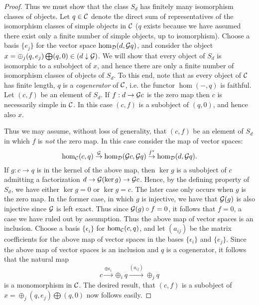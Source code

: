 \documentclass[a4paper]{amsart}
\begin{document}
\begin{proof}
Thus we must show that the class $S_d$ has finitely many isomorphism classes of objects. Let $q \in \mathcal C$ denote the direct sum of representatives of the isomorphism classes of simple objects in $\mathcal C$ ($q$ exists because we have assumed there exist only a finite number of simple objects, up to isomorphism). Choose a basis $\{e_j\}$ for the vector space $\hom_{\mathcal D}(d, \mathcal G q)$, and consider the object $x = \oplus_j( q, e_j) \bigoplus (q,0) \in (d \downarrow \mathcal G)$. We will show that every object of $S_d$ is isomorphic to a subobject of $x$, and hence there are only a finite number of isomorphism classes of objects of $S_d$. To this end, note that as every object of $\mathcal C$ has finite length, $q$ is a {\em cogenerator} of $\mathcal C$, i.e. the functor $\hom(-, q)$ is faithful. Let $(c, f)$ be an element of $S_d$. If $f: d \to \mathcal G c$ is the zero map then $c$ is necessarily simple in $\mathcal C$. In this case $(c, f)$ is a subobject of $(q, 0)$, and hence also $x$. 

Thus we may assume, without loss of generality, that  $(c, f)$ be an element of $S_d$ in which $f$ is {\em not} the zero map. In this case consider the map of vector spaces:
\begin{equation*}
	\hom_{\mathcal C}(c,q) \stackrel{\mathcal G}{\to} \hom_{\mathcal D}(\mathcal G c, \mathcal G q) \stackrel{f^*}{\to} \hom_{\mathcal D}(d, \mathcal G q).
\end{equation*} 
If $g: c \to q$ is in the kernel of the above map, then $\ker g$ is a subobject of $c$ admitting a factorization $d \to \mathcal G(\ker g) \to \mathcal G c$. Hence, by the defining property of $S_d$, we have either $\ker g = 0$ or $\ker g = c$. The later case only occurs when $g$ is the zero map. In the former case, in which $g$ is injective, we have that $\mathcal G(g)$ is also injective since $\mathcal G$ is left exact. Thus since $\mathcal G(g) \circ f = 0$, it follows that $f = 0$, a case we have ruled out by assumption. Thus the above map of vector spaces is an inclusion. Choose a basis  $\{ \epsilon_i \}$ for $\hom_{\mathcal C}(c,q)$, and let $(a_{ij})$ be the matrix coefficients for the above map of vector spaces in the bases $\{ \epsilon_i \}$ and $\{ e_j \}$. Since the above map of vector spaces is an inclusion and $q$ is a cogenerator, it follows that the natural map
\begin{equation*}
	c \stackrel{\oplus \epsilon_i}{\to} \oplus_i q \stackrel{(a_{ij}) }{\to} \oplus_j q
\end{equation*} 
is a monomorphism in $\mathcal C$. The desired result, that $(c,f)$ is a subobject of $x = \oplus_j( q, e_j) \bigoplus (q,0)$ now follows easily. 
\end{proof}
\end{document}
